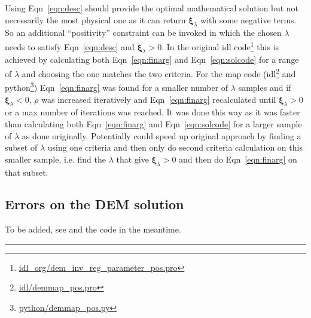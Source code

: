 \documentclass[12pt,a4paper]{article}
\begin{document}
Using Eqn~\ref{eqn:desc} should provide the optimal mathematical solution but not necessarily the most physical one as it can return $\boldsymbol{\xi}_\lambda$ with some negative terms. So an additional ``positivity'' constraint can be invoked in which the chosen $\lambda$ needs to satisfy Eqn~\ref{eqn:desc} and $\boldsymbol{\xi}_\lambda >0$. In the original idl code\footnote{\href{https://github.com/ianan/demreg/blob/master/idl_org/dem_inv_reg_parameter_pos.pro}{idl\_org/dem\_inv\_reg\_parameter\_pos.pro}} this is achieved by calculating both Eqn~\ref{eqn:finarg} and Eqn~\ref{eqn:solcode} for a range of $\lambda$ and choosing the one matches the two criteria. For the map code (idl\footnote{\href{https://github.com/ianan/demreg/blob/master/idl/demmap_pos.pro}{idl/demmap\_pos.pro}} and python\footnote{\href{https://github.com/ianan/demreg/blob/master/python/demmap_pos.py}{python/demmap\_pos.py}}) Eqn~\ref{eqn:finarg} was found for a smaller number of $\lambda$ samples and if $\boldsymbol{\xi}_\lambda <0$, $\rho$ was increased iteratively and Eqn~\ref{eqn:finarg} recalculated until $\boldsymbol{\xi}_\lambda >0$ or a max number of iterations was reached. It was done this way as it was faster than calculating both Eqn~\ref{eqn:finarg} and Eqn~\ref{eqn:solcode} for a larger sample of $\lambda$ as done originally. Potentially could speed up original approach by finding a subset of $\lambda$ using one criteria and then only do second criteria calculation on this smaller sample, i.e. find the $\lambda$ that give $\boldsymbol{\xi}_\lambda > 0$ and then do Eqn~\ref{eqn:finarg} on that subset.

\subsection*{Errors on the DEM solution}

To be added, see \citet{2012A&A...539A.146H,2013A&A...553A..10H} and the code in the meantime.

\par\noindent\rule{0.5\textwidth}{0.4pt}
\end{document}
